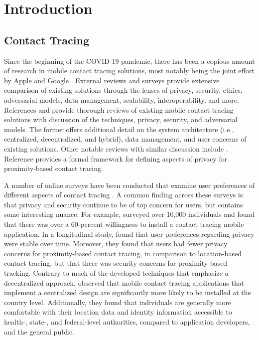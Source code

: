 \chapter{Introduction}

\section{Contact Tracing}
Since the beginning of the COVID-19 pandemic, there has been a copious amount
of research in mobile contact tracing solutions, most notably being the joint
effort by Apple and Google \cite{AppleGoogle}. External reviews and surveys
provide extensive comparison of existing solutions through the lenses of
privacy, security, ethics, adversarial models, data management, scalability,
interoperability, and more. References \cite{Ahmed2020} and \cite{Martin2020}
provide thorough reviews of existing mobile contact tracing solutions with
discussion of the techniques, privacy, security, and adversarial models. The
former offers additional detail on the system architecture (i.e., centralized,
decentralized, and hybrid), data management, and user concerns of existing
solutions. Other notable reviews with similar discussion include \cite{Wen2020,
Raskar2020, Cho2020, Dar2020, Lucivero2020}. Reference \cite{Kuhn2021} provides
a formal framework for defining aspects of privacy for proximity-based contact
tracing.

A number of online surveys have been conducted that examine user preferences
of different aspects of contact tracing \cite{Simko2020, Altmann2020, Li2020}.
A common finding across these surveys is that privacy and security continue to
be of top concern for users, but contains some interesting nuance. For example,
\cite{Altmann2020} surveyed over 10,000 individuals and found that there was
over a 60-percent willingness to install a contact tracing mobile application.
In a longitudinal study, \cite{Simko2020} found that user preferences regarding
privacy were stable over time. Moreover, they found that users had fewer
privacy concerns for proximity-based contact tracing, in comparison to
location-based contact tracing, but that there was security concerns for
proximity-based tracking. Contrary to much of the developed techniques that
emphasize a decentralized approach, \cite{Li2020} observed that mobile contact
tracing applications that implement a centralized design are significantly more
likely to be installed at the country level. Additionally, they found that
individuals are generally more comfortable with their location data and
identity information accessible to health-, state-, and federal-level
authorities, compared to application developers, and the general
public.

